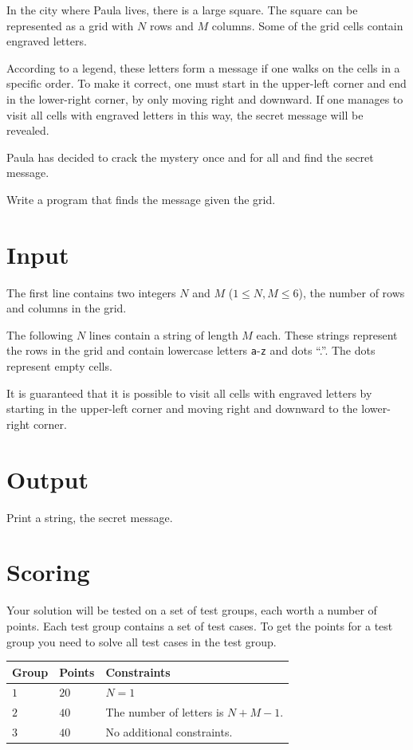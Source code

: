 \noindent
In the city where Paula lives, there is a large square. 
The square can be represented as a grid with $N$ rows and $M$ columns. 
Some of the grid cells contain engraved letters.

According to a legend, these letters form a message if one walks on the cells 
in a specific order. To make it correct, one must start in the upper-left 
corner and end in the lower-right corner, by only moving right and downward. 
If one manages to visit all cells with engraved letters in this way, 
the secret message will be revealed.

Paula has decided to crack the mystery once and for all and find the secret message.

Write a program that finds the message given the grid.

\section*{Input}
The first line contains two integers $N$ and $M$ ($1 \leq N, M \leq 6$), 
the number of rows and columns in the grid.

The following $N$ lines contain a string of length $M$ each. 
These strings represent the rows in the grid and contain lowercase 
letters \texttt{a}-\texttt{z} and dots ``.''. The dots represent empty cells.

It is guaranteed that it is possible to visit all cells with engraved letters 
by starting in the upper-left corner and moving right and downward to the lower-right corner.

\section*{Output}
Print a string, the secret message.

\section*{Scoring}
Your solution will be tested on a set of test groups, each worth a number of points. Each test group contains
a set of test cases. To get the points for a test group you need to solve all test cases in the test group.

\noindent
\begin{tabular}{| l | l | p{12cm} |}
  \hline
  \textbf{Group} & \textbf{Points} & \textbf{Constraints} \\ \hline
  $1$    & $20$       & $N = 1$ \\ \hline
  $2$    & $40$       & The number of letters is $N+M-1$. \\ \hline
  $3$    & $40$       & No additional constraints. \\ \hline
\end{tabular}

